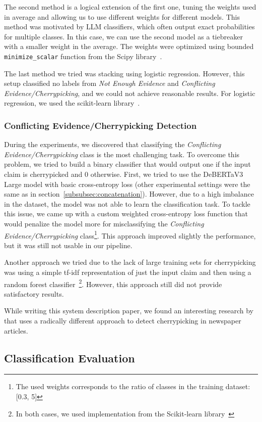 The second method is a logical extension of the first one, tuning the weights used in average and allowing us to use different weights for different models. This method was motivated by LLM classifiers, which often output exact probabilities for multiple classes. In this case, we can use the second model as a tiebreaker with a smaller weight in the average. The weights were optimized using bounded \texttt{minimize\_scalar} function from the Scipy library~\cite{2020SciPy-NMeth}.

The last method we tried was stacking using logistic regression. However, this setup classified no labels from \textit{Not Enough Evidence} and \textit{Conflicting Evidence/Cherrypicking}, and we could not achieve reasonable results. For logistic regression, we used the scikit-learn library~\cite{scikit-learn}.

\subsubsection*{Conflicting Evidence/Cherrypicking Detection}

During the experiments, we discovered that classifying the \textit{Conflicting Evidence/Cherrypicking} class is the most challenging task. To overcome this problem, we tried to build a binary classifier that would output one if the input claim is cherrypicked and 0 otherwise. First, we tried to use the DeBERTaV3 Large model with basic cross-entropy loss (other experimental settings were the same as in section~\ref{subsubsec:concatenation}). However, due to a high imbalance in the dataset, the model was not able to learn the classification task. To tackle this issue, we came up with a custom weighted cross-entropy loss function that would penalize the model more for misclassifying the \textit{Conflicting Evidence/Cherrypicking} class\footnote{The used weights corresponds to the ratio of classes in the training dataset: [0.3, 5]}. This approach improved slightly the performance, but it was still not usable in our pipeline.

Another approach we tried due to the lack of large training sets for cherrypicking was using a simple tf-idf representation of just the input claim and then using a random forest classifier~\footnote{In both cases, we used implementation from the Scikit-learn library~\cite{scikit-learn}}. However, this approach still did not provide satisfactory results.

While writing this system description paper, we found an interesting research by~\citet{jaradat2024contextawaredetectioncherrypickingnews} that uses a radically different approach to detect cherrypicking in newspaper articles.


\subsection{Classification Evaluation}


